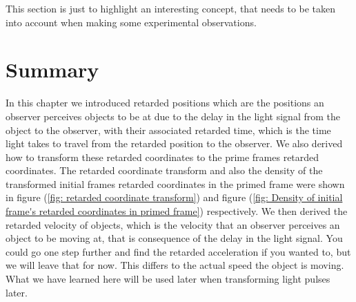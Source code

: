 This section is just to highlight an interesting concept, that needs to be taken into account when making some experimental observations.






\section{Summary}\label{sect: Summary chapter 4}

In this chapter we introduced retarded positions which are the positions an observer perceives objects to be at due to the delay in the light signal from the object to the observer, with their associated retarded time, which is the time light takes to travel from the retarded position to the observer.
We also derived how to transform these retarded coordinates to the prime frames retarded coordinates.
The retarded coordinate transform and also the density of the transformed initial frames retarded coordinates in the primed frame were shown in figure (\ref{fig: retarded coordinate transform}) and figure (\ref{fig: Density of initial frame's retarded coordinates in primed frame}) respectively.
We then derived the retarded velocity of objects, which is the velocity that an observer perceives an object to be moving at, that is consequence of the delay in the light signal.
You could go one step further and find the retarded acceleration if you wanted to, but we will leave that for now.
This differs to the actual speed the object is moving.
What we have learned here will be used later when transforming light pulses later.

